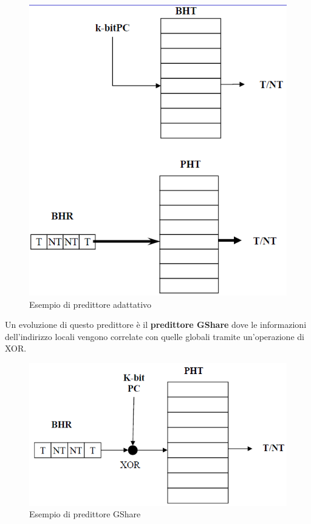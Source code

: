 \begin{figure}[htb]
\centering
\includegraphics[scale=0.5]{img/gapred.png}
\caption{Esempio di predittore adattativo}\label{fig:gapred}
\end{figure}
Un evoluzione di questo predittore è il \textbf{predittore GShare} dove le informazioni dell'indirizzo locali vengono correlate con quelle globali tramite un'operazione di XOR.
\begin{figure}[htb]
\centering
\includegraphics[scale=0.5]{img/gshare.png}
\caption{Esempio di predittore GShare}\label{fig:gshare}
\end{figure}
